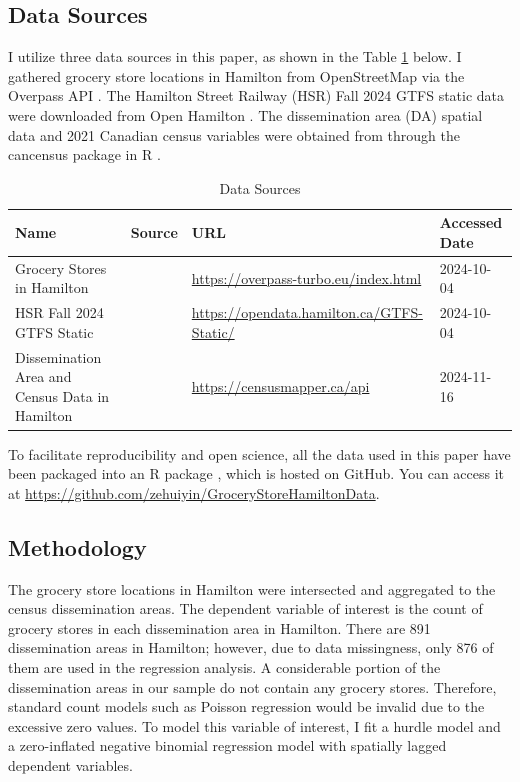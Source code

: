 \documentclass[preprint, 3p,
authoryear]{elsarticle} %
\begin{document}
\subsection{Data Sources}\label{data-sources}

I utilize three data sources in this paper, as shown in the Table
\ref{tab:data_source} below. I gathered grocery store locations in
Hamilton from OpenStreetMap \citep{osm} via the Overpass API
\citep{overpass}. The Hamilton Street Railway (HSR) Fall 2024 GTFS
static data were downloaded from Open Hamilton \citep{hsr_gtfs}. The
dissemination area (DA) spatial data and 2021 Canadian census variables
were obtained from \citet{census} through the cancensus package in R
\citep{cancensus}.

\begin{table}[h]
\centering
\begin{footnotesize}
\begin{tabularx}{\textwidth}{XXll}
\hline
Name                                           & Source              & URL                                             & Accessed Date \\
\hline
Grocery Stores in Hamilton                     & \cite{osm}          & \url{https://overpass-turbo.eu/index.html}      & 2024-10-04    \\
HSR Fall 2024 GTFS Static                      & \cite{hsr_gtfs}     & \url{https://opendata.hamilton.ca/GTFS-Static/} & 2024-10-04    \\
Dissemination Area and Census Data in Hamilton & \cite{census}       & \url{https://censusmapper.ca/api}               & 2024-11-16    \\
\hline
\end{tabularx}
\caption{\label{tab:data_source}Data Sources}
\end{footnotesize}
\end{table}

To facilitate reproducibility and open science, all the data used in
this paper have been packaged into an R package
\citep{GroceryStoreHamiltonData}, which is hosted on GitHub. You can
access it at \url{https://github.com/zehuiyin/GroceryStoreHamiltonData}.

\subsection{Methodology}\label{methodology}

The grocery store locations in Hamilton were intersected and aggregated
to the census dissemination areas. The dependent variable of interest is
the count of grocery stores in each dissemination area in Hamilton.
There are 891 dissemination areas in Hamilton; however, due to data
missingness, only 876 of them are used in the regression analysis. A
considerable portion of the dissemination areas in our sample do not
contain any grocery stores. Therefore, standard count models such as
Poisson regression would be invalid due to the excessive zero values. To
model this variable of interest, I fit a hurdle model and a
zero-inflated negative binomial regression model with spatially lagged
dependent variables.
\end{document}
